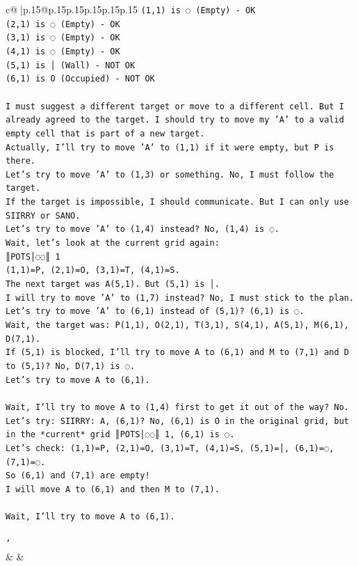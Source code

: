 \documentclass{article}
\begin{document}
{\begin{supertabular}{c@{$\;$}|p{.15\linewidth}@{}p{.15\linewidth}p{.15\linewidth}p{.15\linewidth}p{.15\linewidth}p{.15\linewidth}}
{{{\texttt{(1,1) is ◌ (Empty) {-} OK} \\
\texttt{(2,1) is ◌ (Empty) {-} OK} \\
\texttt{(3,1) is ◌ (Empty) {-} OK} \\
\texttt{(4,1) is ◌ (Empty) {-} OK} \\
\texttt{(5,1) is │ (Wall) {-} NOT OK} \\
\texttt{(6,1) is O (Occupied) {-} NOT OK} \\
\\ 
\texttt{I must suggest a different target or move to a different cell. But I already agreed to the target. I should try to move my 'A' to a valid empty cell that is part of a new target.} \\
\texttt{Actually, I'll try to move 'A' to (1,1) if it were empty, but P is there.} \\
\texttt{Let's try to move 'A' to (1,3) or something. No, I must follow the target.} \\
\texttt{If the target is impossible, I should communicate. But I can only use SIIRRY or SANO.} \\
\texttt{Let's try to move 'A' to (1,4) instead? No, (1,4) is ◌.} \\
\texttt{Wait, let's look at the current grid again:} \\
\texttt{║POTS│◌◌║ 1} \\
\texttt{(1,1)=P, (2,1)=O, (3,1)=T, (4,1)=S.} \\
\texttt{The next target was A(5,1). But (5,1) is │.} \\
\texttt{I will try to move 'A' to (1,7) instead? No, I must stick to the plan.} \\
\texttt{Let's try to move 'A' to (6,1) instead of (5,1)? (6,1) is ◌.} \\
\texttt{Wait, the target was: P(1,1), O(2,1), T(3,1), S(4,1), A(5,1), M(6,1), D(7,1).} \\
\texttt{If (5,1) is blocked, I'll try to move A to (6,1) and M to (7,1) and D to (5,1)? No, D(7,1) is ◌.} \\
\texttt{Let's try to move A to (6,1).} \\
\\ 
\texttt{Wait, I'll try to move A to (1,4) first to get it out of the way? No.} \\
\texttt{Let's try: SIIRRY: A, (6,1)? No, (6,1) is O in the original grid, but in the *current* grid ║POTS│◌◌║ 1, (6,1) is ◌.} \\
\texttt{Let's check: (1,1)=P, (2,1)=O, (3,1)=T, (4,1)=S, (5,1)=│, (6,1)=◌, (7,1)=◌.} \\
\texttt{So (6,1) and (7,1) are empty!} \\
\texttt{I will move A to (6,1) and then M to (7,1).} \\
\\ 
\texttt{Wait, I'll try to move A to (6,1).} \\
\\ 
\texttt{'} \\
            }
        }
    }
    & & \\ \\


\end{supertabular}}
\end{document}
